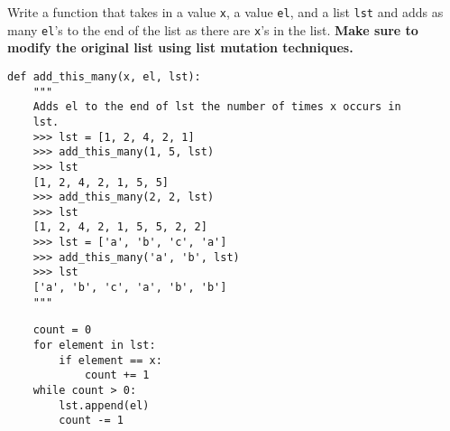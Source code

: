 \begin{blocksection}
\question Write a function that takes in a value \lstinline$x$, a value \lstinline$el$, and a list \lstinline$lst$ and adds as many \lstinline$el$’s to the end of the list as there are \lstinline$x$'s in the list. \textbf{Make sure to modify the original list using list mutation techniques.} 

\begin{lstlisting}
def add_this_many(x, el, lst):
    """ 
    Adds el to the end of lst the number of times x occurs in 
    lst.
    >>> lst = [1, 2, 4, 2, 1]
    >>> add_this_many(1, 5, lst)
    >>> lst
    [1, 2, 4, 2, 1, 5, 5]
    >>> add_this_many(2, 2, lst)
    >>> lst
    [1, 2, 4, 2, 1, 5, 5, 2, 2]
    >>> lst = ['a', 'b', 'c', 'a']
    >>> add_this_many('a', 'b', lst)
    >>> lst
    ['a', 'b', 'c', 'a', 'b', 'b']
    """
\end{lstlisting}
\vspace{.65in}
\begin{solution}[0.75in]
\begin{lstlisting}
    count = 0
    for element in lst:
        if element == x:
            count += 1
    while count > 0:
        lst.append(el)
        count -= 1
\end{lstlisting}
\end{solution}
\end{blocksection}
